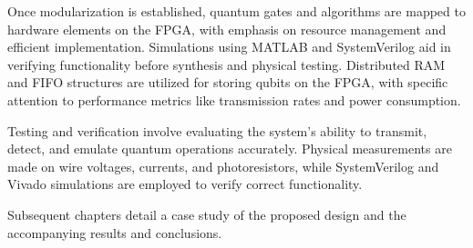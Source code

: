 Once modularization is established, quantum gates and algorithms are mapped to hardware elements on the FPGA, with emphasis on resource management and efficient implementation. Simulations using MATLAB and SystemVerilog aid in verifying functionality before synthesis and physical testing. Distributed RAM and FIFO structures are utilized for storing qubits on the FPGA, with specific attention to performance metrics like transmission rates and power consumption.

Testing and verification involve evaluating the system’s ability to transmit, detect, and emulate quantum operations accurately. Physical measurements are made on wire voltages, currents, and photoresistors, while SystemVerilog and Vivado simulations are employed to verify correct functionality.

Subsequent chapters detail a case study of the proposed design and the accompanying results and conclusions. 